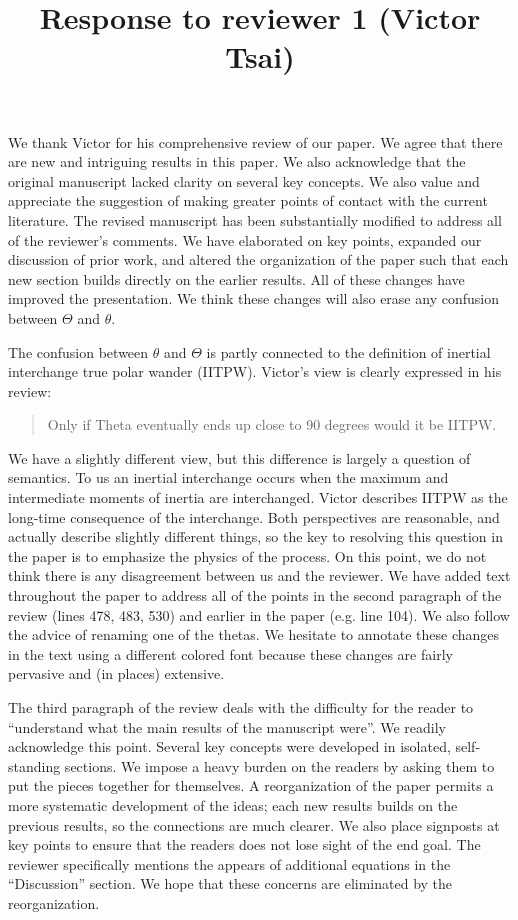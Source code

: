 \documentclass[a4paper,12pt]{article}
\title{Response to reviewer 1 (Victor Tsai)}
\author{}
\date{}
\begin{document}
\maketitle

We thank Victor for his comprehensive review of our paper.
We agree that there are new and intriguing results in this paper.
We also acknowledge that the original manuscript lacked clarity on several key concepts.
We also value and appreciate the suggestion of making greater points of contact with the current literature.
The revised manuscript has been substantially modified to address all of the reviewer's comments.
We have elaborated on key points, expanded our discussion of prior work, and altered the organization of the paper such that each new section builds directly on the earlier results.
All of these changes have improved the presentation.
We think these changes will also erase any confusion between $\Theta$ and $\theta$.


The confusion between $\theta$ and $\Theta$ is partly connected to the definition of inertial interchange true polar wander (IITPW).
Victor's view is clearly expressed in his review:
\begin{quote}
Only if Theta eventually ends up close to 90 degrees would it be IITPW.
\end{quote}
We have a slightly different view, but this difference is largely a question of semantics.
To us an inertial interchange occurs when the maximum and intermediate moments of inertia are interchanged.
Victor describes IITPW as the long-time consequence of the interchange.
Both perspectives are reasonable, and actually describe slightly different things, so the key to resolving this question in the paper is to emphasize the physics of the process.
On this point, we do not think there is any disagreement between us and the reviewer.
We have added text throughout the paper to address all of the points in the second paragraph of the review (lines 478, 483, 530) and earlier in the paper (e.g. line 104).
We also follow the advice of renaming one of the thetas.
We hesitate to annotate these changes in the text using a different colored font because these changes are fairly pervasive and (in places) extensive.

The third paragraph of the review deals with the difficulty for the reader to ``understand what the main results of the manuscript were''.
We readily acknowledge this point.
Several key concepts were developed in isolated, self-standing sections.
We impose a heavy burden on the readers by asking them to put the pieces together for themselves.
A reorganization of the paper permits a more systematic development of the ideas; each new results builds on the previous results, so the connections are much clearer.
We also place signposts at key points to ensure that the readers does not lose sight of the end goal.
The reviewer specifically mentions the appears of additional equations in the ``Discussion'' section.
We hope that these concerns are eliminated by the reorganization.
\end{document}
